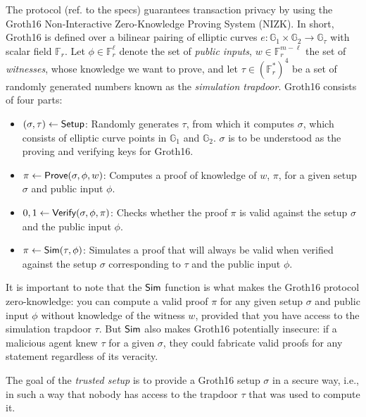
The \MantaPay{} protocol (ref. to the specs) guarantees transaction privacy by using the Groth16 \cite{groth16} Non-Interactive Zero-Knowledge Proving System (NIZK). In short, Groth16 is defined over a bilinear pairing of elliptic curves $e: \mathbb{G}_1 \times \mathbb{G}_2 \rightarrow \mathbb{G}_\tau$ with scalar field $\mathbb{F}_r$. Let $\phi \in \mathbb{F}_r^\ell$ denote the set of \emph{public inputs}, $w \in \mathbb{F}_r^{m-\ell}$ the set of \emph{witnesses}, whose knowledge we want to prove, and let $\tau \in (\mathbb{F}_r^{*})^4$ be a set of randomly generated numbers known as the \emph{simulation trapdoor}. Groth16 consists of four parts:
\begin{itemize}
\item $(\sigma, \tau) \leftarrow {\textsf{Setup}}$: Randomly generates $\tau$, from which it computes $\sigma$, which consists of elliptic curve points in $\mathbb{G}_1$ and $\mathbb{G}_2$. $\sigma$ is to be understood as the proving and verifying keys for Groth16.
\item $\pi \leftarrow {\textsf{Prove}}(\sigma, \phi, w)$: Computes a proof of knowledge of $w$, $\pi$, for a given setup $\sigma$ and public input $\phi$.
\item $0, 1 \leftarrow {\textsf{Verify}}(\sigma, \phi, \pi)$: Checks whether the proof $\pi$ is valid against the setup $\sigma$ and the public input $\phi$.
\item $\pi \leftarrow {\textsf{Sim}}(\tau, \phi)$: Simulates a proof that will always be valid when verified against the setup $\sigma$ corresponding to $\tau$ and the public input $\phi$.
\end{itemize}

It is important to note that the ${\textsf{Sim}}$ function is what makes the Groth16 protocol zero-knowledge: you can compute a valid proof $\pi$ for any given setup $\sigma$ and public input $\phi$ without knowledge of the witness $w$, provided that you have access to the simulation trapdoor $\tau$. But ${\textsf{Sim}}$ also makes Groth16 potentially insecure: if a malicious agent knew $\tau$ for a given $\sigma$, they could fabricate valid proofs for any statement regardless of its veracity. 

The goal of the \emph{trusted setup} is to provide a Groth16 setup $\sigma$ in a secure way, i.e., in such a way that nobody has access to the trapdoor $\tau$ that was used to compute it.

